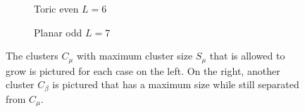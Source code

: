 \begin{figure}[h]
\begin{subfigure}{0.45\linewidth}
    \caption{Toric even $L=6$}
  \end{subfigure}
  \begin{subfigure}{0.45\linewidth}
    \centering
    \caption{Planar odd $L=7$}
  \end{subfigure}
  \caption{The clusters $C_\mu$ with maximum cluster size $S_\mu$ that is allowed to grow is pictured for each case on the left. On the right, another cluster $C_\beta$ is pictured that has a maximum size while still separated from $C_\mu$.}\label{fig:bucket_cmsizes}
\end{figure}